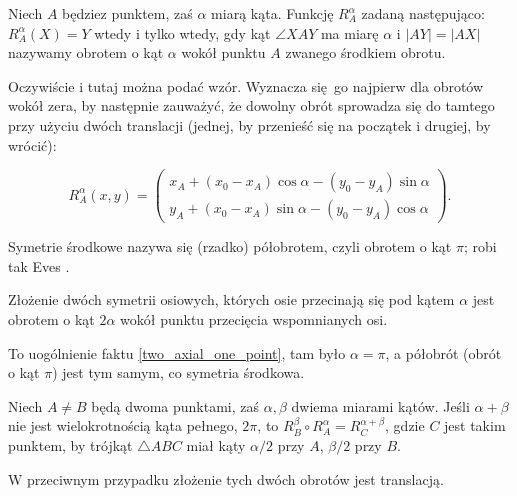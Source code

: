
\begin{definition}[obrót]
    Niech $A$ będziez punktem, zaś $\alpha$ miarą kąta.
    Funkcję $R_A^\alpha$ zadaną następująco: $R_A^\alpha(X) = Y$ wtedy i tylko wtedy, gdy kąt $\angle XAY$ ma miarę $\alpha$ i $|AY| = |AX|$ nazywamy obrotem o kąt $\alpha$ wokół punktu $A$ zwanego środkiem obrotu.
\end{definition}

Oczywiście i tutaj można podać wzór.
Wyznacza się go najpierw dla obrotów wokół zera, by następnie zauważyć, że dowolny obrót sprowadza się do tamtego przy użyciu dwóch translacji (jednej, by przenieść się na początek i drugiej, by wrócić):

\begin{equation}
    R_A^\alpha(x,y) = \begin{pmatrix}
        x_A + (x_0 - x_A) \cos \alpha - (y_0 - y_A) \sin \alpha\\
        y_A + (x_0 - x_A) \sin \alpha - (y_0 - y_A) \cos \alpha
    \end{pmatrix}.
\end{equation}

Symetrie środkowe nazywa się (rzadko) półobrotem, czyli obrotem o kąt $\pi$; robi tak Eves \cite[s. 105]{eves1_1972}.

\begin{proposition}
    Złożenie dwóch symetrii osiowych, których osie przecinają się pod kątem $\alpha$ jest obrotem o kąt $2 \alpha$ wokół punktu przecięcia wspomnianych osi.
\end{proposition}

To uogólnienie faktu \ref{two_axial_one_point}, tam było $\alpha = \pi$, a półobrót (obrót o kąt $\pi$) jest tym samym, co symetria środkowa.

\begin{proposition}
\label{for_banach_11}%
    Niech $A \neq B$ będą dwoma punktami, zaś $\alpha, \beta$ dwiema miarami kątów.
    Jeśli $\alpha + \beta$ nie jest wielokrotnością kąta pełnego, $2 \pi$, to $R_B^\beta \circ R_A^\alpha = R_C^{\alpha + \beta}$, gdzie $C$ jest takim punktem, by trójkąt $\triangle ABC$ miał kąty $\alpha/2$ przy $A$, $\beta / 2$ przy $B$.

    W przeciwnym przypadku złożenie tych dwóch obrotów jest translacją.
\end{proposition}